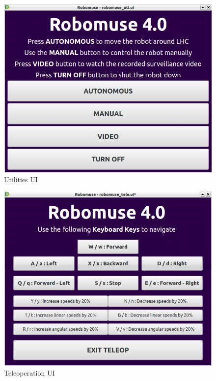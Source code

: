 \documentclass[12pt]{article}
\begin{document}
\begin{figure}[H]
\centering
\includegraphics[scale=0.5]{Robomuse_uti.png}
\caption{Utilities UI}
\end{figure}

\begin{figure}[H]
\centering
\includegraphics[scale=0.5]{Robomuse_tele.png}
\caption{Teleoperation UI}
\end{figure}
\end{document}
